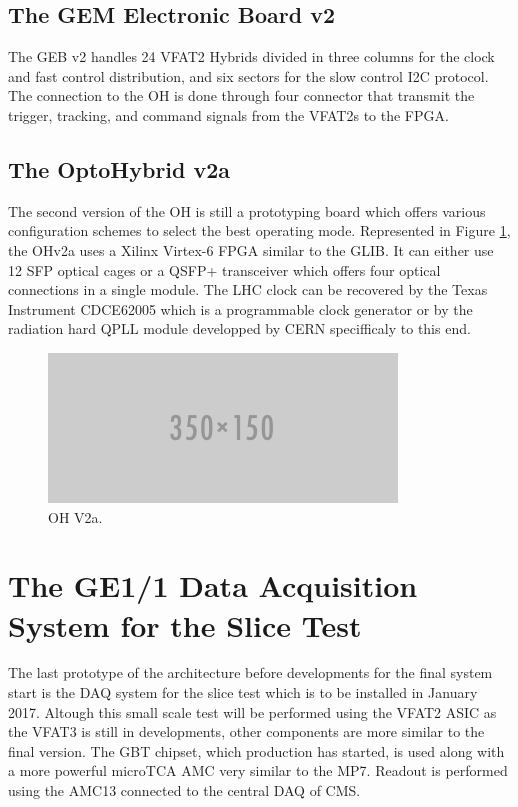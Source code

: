     \subsection{The GEM Electronic Board v2}

      The GEB v2 handles 24 VFAT2 Hybrids divided in three columns for the clock and fast control distribution, and six sectors for the slow control I2C protocol. The connection to the OH is done through four connector that transmit the trigger, tracking, and command signals from the VFAT2s to the FPGA.

    \subsection{The OptoHybrid v2a}

      The second version of the OH is still a prototyping board which offers various configuration schemes to select the best operating mode. Represented in Figure \ref{fig:II-2-daq-ohv2a}, the OHv2a uses a Xilinx Virtex-6 FPGA similar to the GLIB. It can either use 12 SFP optical cages or a QSFP+ transceiver which offers four optical connections in a single module. The LHC clock can be recovered by the Texas Instrument CDCE62005 which is a programmable clock generator or by the radiation hard QPLL module developped by CERN specifficaly to this end.

      \begin{figure}[h!]
        \centering
        \includegraphics[width=\textwidth]{img/empty.png}
        \caption{OH V2a.}
        \label{fig:II-2-daq-ohv2a}
      \end{figure}

  \section{The GE1/1 Data Acquisition System for the Slice Test}

    The last prototype of the architecture before developments for the final system start is the DAQ system for the slice test which is to be installed in January 2017. Altough this small scale test will be performed using the VFAT2 ASIC as the VFAT3 is still in developments, other components are more similar to the final version. The GBT chipset, which production has started, is used along with a more powerful microTCA AMC very similar to the MP7. Readout is performed using the AMC13 connected to the central DAQ of CMS.


